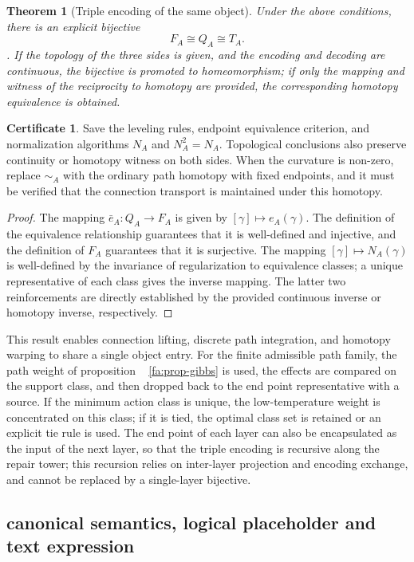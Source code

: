 \documentclass[11pt,a4paper]{article}
\theoremstyle{plain}
\newtheorem{theorem}{Theorem}[section]
\theoremstyle{definition}
\newtheorem*{certificate}{Certificate}
\theoremstyle{remark}
\begin{document}
\begin{CJK*}
\begin{theorem}
[Triple encoding of the same object]\label{ss:three-encoding}
Under the above conditions, there is an explicit bijective \[
 F_A\cong Q_A\cong T_A.
\]. If the topology of the three sides is given, and the encoding and decoding are continuous, the bijective is promoted to homeomorphism; if only the mapping and witness of the reciprocity to homotopy are provided, the corresponding homotopy equivalence is obtained.\end{theorem}
\begin{certificate}
Save the leveling rules, endpoint equivalence criterion, and normalization algorithms $N_A$ and $N_A^2=N_A$. Topological conclusions also preserve continuity or homotopy witness on both sides. When the curvature is non-zero, replace $\sim_A$ with the ordinary path homotopy with fixed endpoints, and it must be verified that the connection transport is maintained under this homotopy.\end{certificate}
\begin{proof}
The mapping $\bar e_A:Q_A\to F_A$ is given by $[\gamma]\mapsto e_A(\gamma)$. The definition of the equivalence relationship guarantees that it is well-defined and injective, and the definition of $F_A$ guarantees that it is surjective. The mapping $[\gamma]\mapsto N_A(\gamma)$ is well-defined by the invariance of regularization to equivalence classes; a unique representative of each class gives the inverse mapping. The latter two reinforcements are directly established by the provided continuous inverse or homotopy inverse, respectively.\end{proof}


This result enables connection lifting, discrete path integration, and homotopy warping to share a single object entry. For the finite admissible path family, the path weight of proposition ~ \ref{fa:prop-gibbs} is used, the effects are compared on the support class, and then dropped back to the end point representative with a source. If the minimum action class is unique, the low-temperature weight is concentrated on this class; if it is tied, the optimal class set is retained or an explicit tie rule is used. The end point of each layer can also be encapsulated as the input of the next layer, so that the triple encoding is recursive along the repair tower; this recursion relies on inter-layer projection and encoding exchange, and cannot be replaced by a single-layer bijective.

\subsection { canonical semantics, logical placeholder and text expression }


\end{CJK*}
\end{document}
